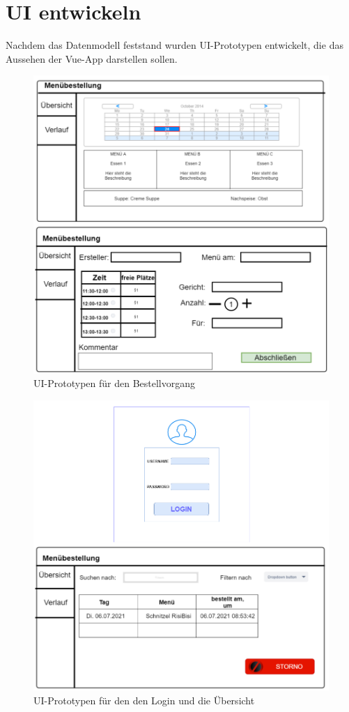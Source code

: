\section{UI entwickeln}

Nachdem das Datenmodell feststand wurden UI-Prototypen entwickelt, die das Aussehen der Vue-App darstellen sollen.

\begin{figure}[htp]
    \author{Benjamin Besic}
    \centering
    \includegraphics[scale=0.36]{pics/UI-Bestellung-Prototyp.png}
    \caption{UI-Prototypen für den Bestellvorgang}
    \label{fig:impl:UIPlanningBest}
\end{figure}

\begin{figure}[htp]
    \author{Benjamin Besic}
    \centering
    \includegraphics[scale=0.36]{pics/UI-Login-Uebersicht-Prototyp.png}
    \caption{UI-Prototypen für den den Login und die Übersicht}
    \label{fig:impl:UIPlanningLogUebersicht}
\end{figure}

\pagebreak